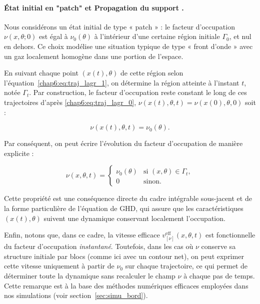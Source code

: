 \medskip

\paragraph{État initial en "patch" et Propagation du support .}
Nous considérons un état initial de type « patch » : le facteur d’occupation $\nu(x ,\theta ;0)$ est égal à $\nu_0(\theta)$ à l’intérieur d’une certaine région initiale $\Gamma_0$, et nul en dehors. Ce choix modélise une situation typique de type « front d’onde » avec un gaz localement homogène dans une portion de l’espace.

En suivant chaque point $(x(t),\theta)$ de cette région selon l’équation~\eqref{chap6:eq:traj_lagr_1}, on détermine la région atteinte à l’instant $t$, notée $\Gamma_t$. Par construction, le facteur d’occupation reste constant le long de ces trajectoires d'après \eqref{chap6:eq:traj_lagr_0}, $\nu(x(t),\theta,t) = \nu(x(0),\theta,0)$  soit :

\begin{equation}
	\nu(x(t),\theta,t)  = \nu_0(\theta).
\end{equation}

Par conséquent, on peut écrire l’évolution du facteur d’occupation de manière explicite :

\begin{equation}
\label{eq:contour_support}
\nu(x, \theta, t) =
\begin{cases}
\nu_0(\theta) & \text{si } (x,\theta) \in \Gamma_t, \\
0 & \text{sinon}.
\end{cases}
\end{equation}

Cette propriété est une conséquence directe du cadre intégrable sous-jacent et de la forme particulière de l’équation de GHD, qui assure que les caractéristiques $(x(t),\theta)$ suivent une dynamique conservant localement l’occupation.

\medskip

Enfin, notons que, dans ce cadre, la vitesse efficace $v^{\mathrm{eff}}_{[\nu]}(x,\theta,t)$ est fonctionnelle du facteur d’occupation \textit{instantané}. Toutefois, dans les cas où $\nu$ conserve sa structure initiale par blocs (comme ici avec un contour net), on peut exprimer cette vitesse uniquement à partir de $\nu_0$ sur chaque trajectoire, ce qui permet de déterminer toute la dynamique sans recalculer le champ $\nu$ à chaque pas de temps. Cette remarque est à la base des méthodes numériques efficaces employées dans nos simulations (voir section~\ref{sec:simu_bord}).


